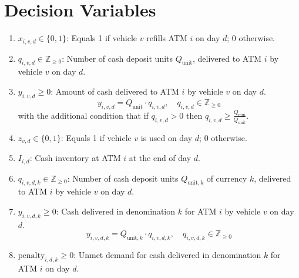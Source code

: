\documentclass[11pt]{article}
\begin{document}
\section*{Decision Variables}
\begin{enumerate}[leftmargin=1.25cm]
    \item \(\displaystyle x_{i,v,d} \in \{0,1\}\): Equals 1 if vehicle \(v\) refills ATM \(i\) on day \(d\); 0 otherwise.
    \item \(\displaystyle q_{i,v,d} \in \mathbb{Z}_{\geq 0}\): Number of cash deposit units \(Q_{\text{unit}}\), delivered to ATM \(i\) by vehicle \(v\) on day \(d\).
    \item \(\displaystyle y_{i,v,d} \ge 0\): Amount of cash delivered to ATM \(i\) by vehicle \(v\) on day \(d\).  
    \[
    y_{i,v,d} = Q_{\text{unit}} \cdot q_{i,v,d}, \quad q_{i,v,d} \in \mathbb{Z}_{\geq 0}
    \]
    with the additional condition that if \(q_{i,v,d} > 0\) then \(q_{i,v,d} \ge \frac{Q_{\min}}{Q_{\text{unit}}}\).
    \item \(\displaystyle z_{v,d} \in \{0,1\}\): Equals 1 if vehicle \(v\) is used on day \(d\); 0 otherwise.
    \item \(\displaystyle I_{i,d}\): Cash inventory at ATM \(i\) at the end of day \(d\).
    \item \(\displaystyle q_{i,v,d,k} \in \mathbb{Z}_{\geq 0}\): Number of cash deposit units \(Q_{\text{unit},k}\) of currency \(k\), delivered to ATM \(i\) by vehicle \(v\) on day \(d\).
    \item \(\displaystyle y_{i,v,d,k} \ge 0\): Cash delivered in denomination \(k\) for ATM \(i\) by vehicle \(v\) on day \(d\).
    \[
    y_{i,v,d,k} = Q_{\text{unit},k} \cdot q_{i,v,d,k}, \quad q_{i,v,d,k} \in \mathbb{Z}_{\geq 0}
    \]
    \item \(\displaystyle \text{penalty}_{i,d,k} \geq 0\): Unmet demand for cash delivered in denomination \(k\) for ATM \(i\) on day \(d\).
\end{enumerate}
\end{document}

